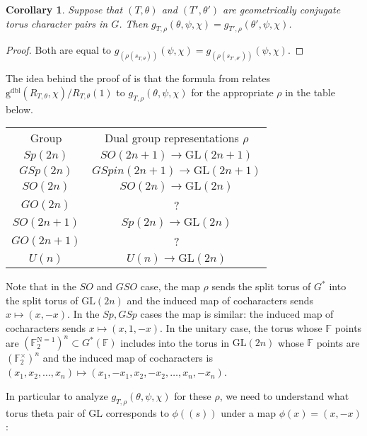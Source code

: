 \documentclass[12pt, reqno]{amsart}
\newtheorem{corollary}[theorem]{Corollary}
\theoremstyle{definition}
\theoremstyle{definition}
\theoremstyle{definition}
\newcommand{\GL}{\mathrm{GL}}
\newcommand{\aFieldNorm}{\mathrm{N}}
\newcommand{\finiteField}{\mathbb{F}}
\newcommand{\finiteFieldExtension}[1]{\finiteField_{#1}}
\newcommand{\NormOneGroup}[1]{\finiteFieldExtension{#1}^{\aFieldNorm = 1}}
\newcommand{\dblVirtualGaussSumScalar}[2]{\mathrm{g}^{\mathrm{dbl}}\left(#1, #2\right)}
\begin{document}
\begin{corollary}
\label{cor:geoconj}
Suppose that $(T,\theta)$ and $(T',\theta')$ are geometrically conjugate torus character pairs in $G$. Then $g_{T,\rho}(\theta,\psi,\chi) = g_{T',\rho}(\theta',\psi,\chi)$.
\end{corollary}
\begin{proof}
Both are equal to $g_{(\rho(s_{T,\theta}))}(\psi,\chi) = g_{(\rho(s_{T',\theta'}))}(\psi,\chi)$.
\end{proof}

The idea behind the proof of  is that the formula from  relates $\dblVirtualGaussSumScalar{R_{T, \theta}}{\chi}/R_{T,\theta}(1)$ to $g_{T,\rho}(\theta,\psi,\chi)$ for the appropriate $\rho$ in the table below. 
\begin{center}
\begin{tabular}{ c c}
 Group & Dual group representations $\rho$ \\ 
 $Sp(2n)$ &$SO(2n+1) \to \GL(2n+1)$\\  
 $GSp(2n)$  &$GSpin(2n+1) \to \GL(2n+1)$ \\
 $SO(2n)$ &$SO(2n) \to \GL(2n)$ \\
 $GO(2n)$ & ? \\
 $SO(2n+1)$ &$Sp(2n) \to \GL(2n)$ \\
 $GO(2n+1)$ & ? \\ 
  $U(n)$  & $U(n) \to \GL(2n)$  
\end{tabular}
\end{center}
Note that in the $SO$ and $GSO$ case, the map $\rho$ sends the split torus of $G^*$ into the split torus of $\GL(2n)$ and the induced map of cocharacters sends $x \mapsto (x,-x)$. In the $Sp,GSp$ cases the map is similar: the induced map of cocharacters sends $x \mapsto (x,1,-x)$. In the unitary case, the torus whose $\finiteField$ points are $(\NormOneGroup{2})^n \subset G^*(\finiteField)$ includes into the torus in $\GL(2n)$ whose $\finiteField$ points are $(\finiteFieldExtension{2}^\times)^n$ and the induced map of cocharacters is $(x_1,x_2, \hdots, x_n) \mapsto (x_1,-x_1,x_2,-x_2, \hdots ,x_n,-x_n)$. 


In particular to analyze $g_{T,\rho}(\theta,\psi,\chi)$ for these $\rho$, we need to understand what torus theta pair of $\GL$ corresponds to $\phi((s))$ under a map $\phi(x) = (x,-x)$:
\end{document}
